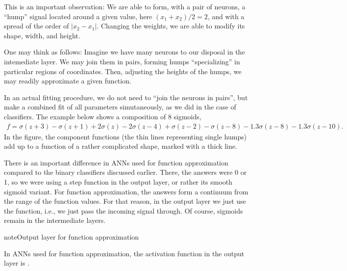\documentclass[letterpaper,10pt,english]{jupyterBook}
\begin{document}
\noindent{}

\sphinxAtStartPar
This is an important observation:
We are able to form, with a pair of neurons, a “hump” signal located around a given value, here \( (x_1 + x_2) / 2 = 2\), and with a spread of the order of \(|x_2-x_1|\). Changing the weights, we are able to modify its shape, width, and height.

\sphinxAtStartPar
One may think as follows: Imagine we have many neurons to our disposal in the intemediate layer. We may join them in pairs, forming humps “specializing” in particular regions of coordinates. Then, adjusting the heights of the humps, we may readily approximate a given function.

\sphinxAtStartPar
In an actual fitting procedure, we do not need to “join the neurons in pairs”, but make a combined fit of all parameters simutaneously, as we did in the case of classifiers.
The example below shows a composition of 8 sigmoids,
\begin{equation*}
\begin{split}
f = \sigma(z+3)-\sigma(z+1)+2 \sigma(z)-2\sigma(z-4)+
      \sigma(z-2)-\sigma(z-8)-1.3 \sigma(z-8)-1.3\sigma(z-10). 
\end{split}
\end{equation*}
\sphinxAtStartPar
In the figure, the component functions (the thin lines representing single humps) add up to a function of a rather complicated shape, marked with a thick line.

\noindent{}

\sphinxAtStartPar
There is an important difference in ANNs used for function approximation compared to the binary classifiers discussed earlier. There, the answers were 0 or 1, so we were using a step function in the output layer, or rather its smooth sigmoid variant. For function approximation, the answers form a continuum from the range of the function values. For that reason, in the output layer we just use the  function, i.e., we just pass the incoming signal through. Of course, sigmoids remain in the intermediate layers.

\begin{sphinxadmonition}{note}{Output layer for function approximation}

\sphinxAtStartPar
In ANNs used for function approximation, the activation function in the output layer is .
\end{sphinxadmonition}
\end{document}
